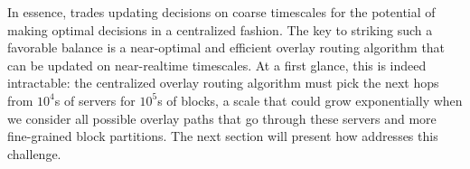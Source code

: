 In essence, \name trades updating decisions on coarse timescales
for the potential of making optimal decisions in a centralized
fashion.
The key to striking such a favorable balance is a
near-optimal and efficient overlay routing
algorithm that can be updated on near-realtime timescales.
At a first glance, this is indeed intractable:
the centralized overlay routing algorithm must pick the next hops
from $10^4$s of servers for $10^5$s of blocks, a scale that could
grow exponentially when we consider all possible
overlay paths that go through these servers and more fine-grained block partitions.
The next section will present how \name addresses this challenge.


%
%
%
%
%
%



